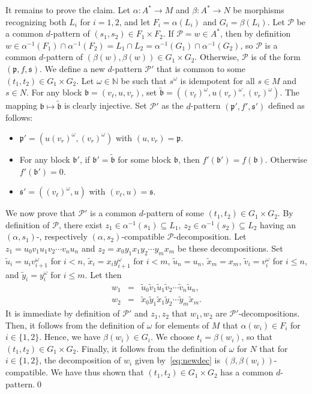 \documentclass{LMCS}
\newcommand\nat{\ensuremath{\mathbb{N}}\xspace}
\newcommand\Ps{\ensuremath{\mathcal{P}}\xspace}
\newcommand\decop[1]{\ensuremath{#1}-decomposition\xspace}
\newcommand\decops[1]{\ensuremath{#1}-decompositions\xspace}
\newcommand\pfsdecomp{\decop{\Ps}}
\newcommand\frb{\ensuremath{\mathfrak{b}}\xspace}
\newcommand\frp{\ensuremath{\mathfrak{p}}\xspace}
\newcommand\frs{\ensuremath{\mathfrak{s}}\xspace}
\let\leq\leqslant
\theoremstyle{plain}
\begin{document}
\medskip It remains to prove the claim.  Let $\alpha:A^*\to M$
and $\beta:A^*\to N$ be morphisms recognizing both $L_i$ for $i=1,2$, and let $F_i=\alpha(L_i)$
and $G_i=\beta(L_i)$.  Let $\Ps$ be a common $d$-pattern of $(s_1,s_2)\in
F_1\times F_2$. If $\Ps = w \in A^*$, then by definition $w \in
\alpha^{-1}(F_1) \cap \alpha^{-1}(F_2) = L_1\cap L_2=\alpha^{-1}(G_1) \cap
\alpha^{-1}(G_2)$, so \Ps is a common $d$-pattern of $(\beta(w),\beta(w))\in
G_1\times G_2$. Otherwise, $\Ps$ is of the form $(\frp,f,\frs)$. We define a
new $d$-pattern $\Ps'$ that is common to some $(t_1,t_2)\in G_1\times
G_2$. Let $\omega \in \nat$ be such that $s^\omega$ is idempotent for all $s
\in M$ and $s \in N$. For any block $\frb = (v_{\ell},u,v_r)$, set
$\tilde{\frb} = ((v_{\ell})^\omega,u(v_r)^\omega, (v_r)^\omega)$. The mapping
$\frb \mapsto \tilde{\frb}$ is clearly injective. Set $\Ps'$ as the
$d$-pattern $(\frp',f',\frs')$ defined as follows:
\begin{itemize}
\item $\frp' = (u(v_r)^\omega,(v_r)^\omega)$ with $(u,v_r) = \frp$.
\item For any block $\frb'$, if $\frb' = \tilde{\frb}$ for some block
  $\frb$, then $f'(\frb') = f(\frb)$. Otherwise $f'(\frb') = 0$.
\item $\frs' = ((v_\ell)^{\omega},u)$ with $(v_\ell,u) = \frs$.
\end{itemize}
We now prove that $\Ps'$ is a common $d$-pattern of some $(t_1,t_2)\in
G_1\times G_2$. By definition of \Ps, there exist $z_1 \in
\alpha^{-1}(s_1)\subseteq L_1$, $z_2\in\alpha^{-1}(s_2)\subseteq L_2$ having an $(\alpha,
s_1)$-, respectively $(\alpha,s_2)$-compatible
\pfsdecomp. Let $z_1=u_0v_1u_1v_2 \cdots v_{n}u_n$ and
$z_2=x_0y_1x_1y_2 \cdots y_{m}x_m$ be these decompositions. Set
$\tilde u_i = u_iv_{i+1}^\omega$ for $i<n$, $\tilde x_i=x_iy_{i+1}^\omega$ for $i < m$, $\tilde u_n = u_n$, $\tilde x_m=x_m$, $\tilde
v_i=v_i^\omega$ for $i \leq n$, and $\tilde y_i=y_i^\omega$ for $i\leq m$.
Let then
\begin{equation}
\label{eq:newdec}
\begin{array}{lll}
w_1 & = & \tilde u_0\tilde v_1\tilde u_1\tilde v_2 \cdots \tilde v_{n}\tilde u_n, \\
w_2 & = & \tilde x_0\tilde y_1\tilde x_1\tilde y_2 \cdots \tilde y_{m}\tilde x_m.
\end{array}
\end{equation}
It is immediate by definition of $\Ps'$ and $z_1,z_2$ that $w_1,w_2$ are
\decops{\Ps'}. Then, it follows from the definition of $\omega$ for elements of
$M$ that $\alpha(w_i) \in F_i$ for $i \in \{1,2\}$. Hence, we have
$\beta(w_i) \in G_i$. We choose $t_i=\beta(w_i)$, so that $(t_1,t_2)\in
G_1\times G_2$. Finally, it follows from
the definition of $\omega$ for $N$ that for $i \in \{1,2\}$, the
decomposition of $w_i$ given by~\eqref{eq:newdec} is
$(\beta,\beta(w_i))$-compatible. We have thus shown that
$(t_1,t_2)\in G_1 \times G_2$ has a common $d$-pattern.\qed
\end{document}
